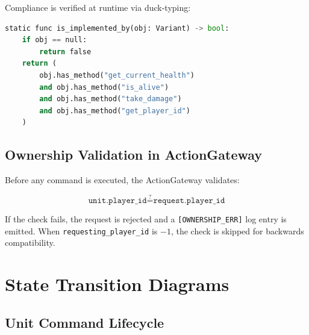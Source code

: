 \documentclass[11pt,a4paper]{article}
\begin{document}
Compliance is verified at runtime via duck-typing:

\begin{lstlisting}[language=Python,caption={IDamageable.is\_implemented\_by()}]
static func is_implemented_by(obj: Variant) -> bool:
    if obj == null:
        return false
    return (
        obj.has_method("get_current_health")
        and obj.has_method("is_alive")
        and obj.has_method("take_damage")
        and obj.has_method("get_player_id")
    )
\end{lstlisting}

\subsection{Ownership Validation in ActionGateway}

Before any command is executed, the ActionGateway validates:

$$
\texttt{unit.player\_id} \stackrel{?}{=} \texttt{request.player\_id}
$$

If the check fails, the request is rejected and a \texttt{[OWNERSHIP\_ERR]}
log entry is emitted. When \texttt{requesting\_player\_id} is $-1$, the check
is skipped for backwards compatibility.

\section{State Transition Diagrams}

\subsection{Unit Command Lifecycle}

\begin{center}
\end{center}
\end{document}
